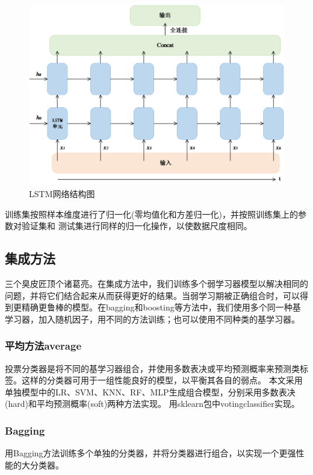 \documentclass[UTF8]{ctexart}
\begin{document}
\begin{figure}[h]
    \centering
    \includegraphics[scale=0.6]{figures/lstm.png}
    \caption{LSTM网络结构图}
    \label{fig:lstm}
\end{figure}

训练集按照样本维度进行了归一化(零均值化和方差归一化)，并按照训练集上的参数对验证集和
测试集进行同样的归一化操作，以使数据尺度相同。

\subsection{集成方法}
三个臭皮匠顶个诸葛亮。在集成方法中，我们训练多个弱学习器模型以解决相同的问题，并将它们结合起来从而获得更好的结果。当弱学习期被正确组合时，可以得到更精确更鲁棒的模型。在bagging和boosting等方法中，我们使用多个同一种基学习器，加入随机因子，用不同的方法训练；也可以使用不同种类的基学习器。
\subsubsection{平均方法average}
投票分类器是将不同的基学习器组合，并使用多数表决或平均预测概率来预测类标签。这样的分类器可用于一组性能良好的模型，以平衡其各自的弱点。
本文采用单独模型中的LR、SVM、KNN、RF、MLP生成组合模型，分别采用多数表决(hard)和平均预测概率(soft)两种方法实现。
用sklearn包中votingclassifier实现。

\subsubsection{Bagging}
用Bagging方法训练多个单独的分类器，并将分类器进行组合，以实现一个更强性能的大分类器。
\end{document}
